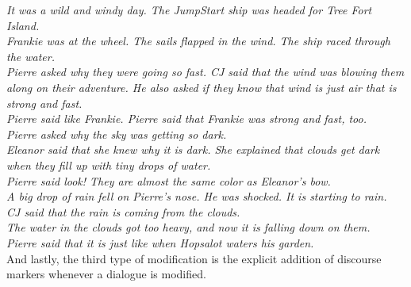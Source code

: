 	\noindent
	\hspace{1 in}\emph{It was a wild and windy day. The JumpStart ship was headed for Tree Fort Island.} \\
	\hspace*{1 in}\emph{Frankie was at the wheel. The sails flapped in the wind. The ship raced through the water.} \\
	\hspace*{1 in}\emph{Pierre asked why they were going so fast. CJ said that the wind was blowing them along on their adventure. He also asked if they know that wind is just air that is strong and fast.} \\
	\hspace*{1 in}\emph{Pierre said like Frankie. Pierre said that Frankie was strong and fast, too.} \\
	\hspace*{1 in}\emph{Pierre asked why the sky was getting so dark.}\\
	\hspace*{1 in}\emph{Eleanor said that she knew why it is dark. She explained that clouds get dark when they fill up with tiny drops of water.} \\
	\hspace*{1 in}\emph{Pierre said look! They are almost the same color as Eleanor's bow.} \\
	\hspace*{1 in}\emph{A big drop of rain fell on Pierre's nose. He was shocked. It is starting to rain.} \\
	\hspace*{1 in}\emph{CJ said that the rain is coming from the clouds.} \\
	\hspace*{1 in}\emph{The water in the clouds got too heavy, and now it is falling down on them.} \\
	\hspace*{1 in}\emph{Pierre said that it is just like when Hopsalot waters his garden.} \\
	
And lastly, the third type of modification is the explicit addition of discourse markers whenever a dialogue is modified.

